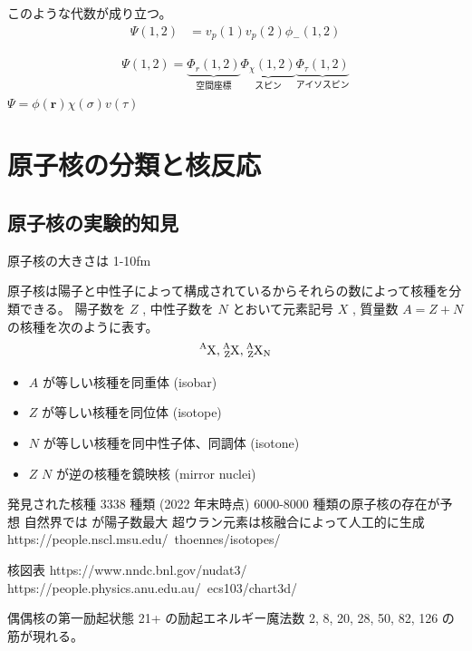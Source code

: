 \documentclass[uplatex,dvipdfmx,a4paper,11pt]{jlreq}
\newcommand{\rr}{\bm{r}}
\numberwithin{equation}{section}
\theoremstyle{definition}
\begin{document}
このような代数が成り立つ。
\begin{align}
  \Psi(1, 2) & = v_p(1)v_p(2)\phi_-(1,2)
\end{align}

\begin{align}
  \Psi(1, 2) = \underbrace{\Phi_r(1, 2)}_{空間座標}\underbrace{\Phi_\chi(1, 2)}_{スピン}\underbrace{\Phi_\tau(1, 2)}_{アイソスピン}
\end{align}
$\Psi = \phi(\rr)\chi(\sigma)v(\tau)$


\section{原子核の分類と核反応}
\subsection{原子核の実験的知見}
原子核の大きさは 1-10fm

原子核は陽子と中性子によって構成されているからそれらの数によって核種を分類できる。
陽子数を $Z$ , 中性子数を $N$ とおいて元素記号 $X$ , 質量数 $A = Z + N$ の核種を次のように表す。
\begin{align}
  \ce{^AX}, \ce{^A_ZX}, \ce{^A_ZX_N}
\end{align}
\begin{itemize}
  \item $A$ が等しい核種を同重体 (isobar)
  \item $Z$ が等しい核種を同位体 (isotope)
  \item $N$ が等しい核種を同中性子体、同調体 (isotone)
  \item $Z$ $N$ が逆の核種を鏡映核 (mirror nuclei)
\end{itemize}

発見された核種 3338 種類 (2022 年末時点)
6000-8000 種類の原子核の存在が予想
自然界では  が陽子数最大
超ウラン元素は核融合によって人工的に生成
https://people.nscl.msu.edu/~thoennes/isotopes/

核図表
https://www.nndc.bnl.gov/nudat3/
https://people.physics.anu.edu.au/~ecs103/chart3d/

偶偶核の第一励起状態 21+ の励起エネルギー魔法数 2, 8, 20, 28, 50, 82, 126 の筋が現れる。
\end{document}
